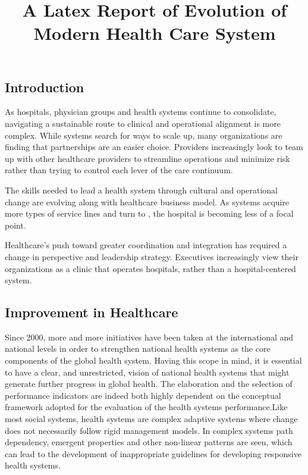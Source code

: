\documentclass[12pt]{article}
\begin{document}
\title{A Latex Report of Evolution of Modern Health Care System}
\maketitle

\subsection{Introduction}
As hospitals, physician groups and health systems continue to consolidate, navigating a sustainable route to clinical and operational alignment is more complex. While systems search for ways to scale up, many organizations are finding that partnerships are an easier choice. Providers increasingly look to team up with other healthcare providers to streamline operations and minimize risk rather than trying to control each lever of the care continuum.

The skills needed to lead a health system through cultural and operational change are evolving along with healthcare business model. As systems acquire more types of service lines and turn to , the hospital is becoming less of a focal point.

Healthcare's push toward greater coordination and integration has required a change in perspective and leadership strategy. Executives increasingly view their organizations as a clinic that operates hospitals, rather than a hospital-centered system.

\subsection{Improvement in Healthcare}
Since 2000, more and more initiatives have been taken at the international and national levels in order to strengthen national health systems as the core components of the global health system. Having this scope in mind, it is essential to have a clear, and unrestricted, vision of national health systems that might generate further progress in global health. The elaboration and the selection of performance indicators are indeed both highly dependent on the conceptual framework adopted for the evaluation of the health systems performance.Like most social systems, health systems are complex adaptive systems where change does not necessarily follow rigid management models. In complex systems path dependency, emergent properties and other non-linear patterns are seen, which can lead to the development of inappropriate guidelines for developing responsive health systems.
\end{document}
